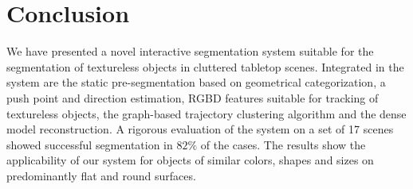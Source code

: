 \section{Conclusion}
\label{sec:conclusion}
We have  presented a novel interactive segmentation  system suitable for
the segmentation of textureless  objects in cluttered tabletop scenes.
Integrated  in the  system are  the static  pre-segmentation  based on
geometrical   categorization,  a  push   point and direction estimation, 
RGBD features  suitable for tracking of
textureless objects,  the graph-based trajectory  clustering algorithm
and the  dense model reconstruction.  A rigorous  evaluation of the
system on a  set of 17 scenes showed successful segmentation in $82\%$ of the cases.  
The results show the applicability of our system
for objects of similar colors,  shapes and sizes on predominantly flat
and  round surfaces.  